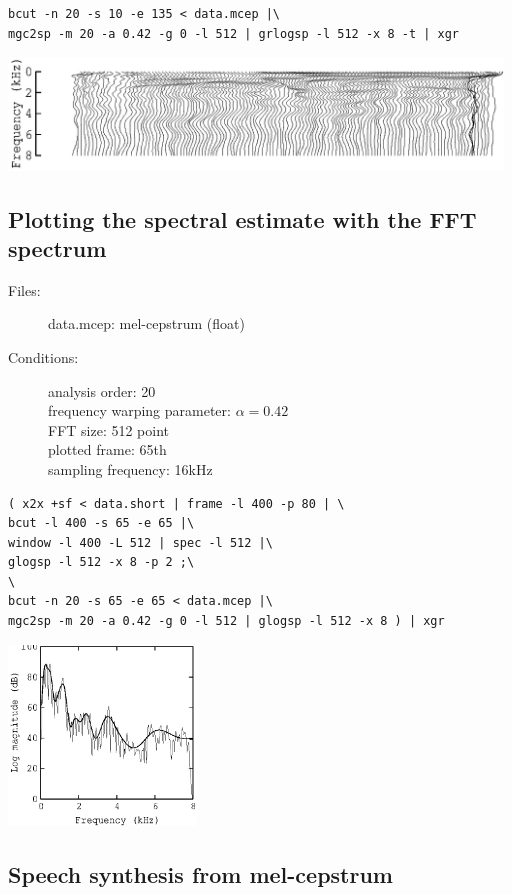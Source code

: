 \documentclass[a4paper]{article}
\begin{document}
\begin{verbatim}
bcut -n 20 -s 10 -e 135 < data.mcep |\
mgc2sp -m 20 -a 0.42 -g 0 -l 512 | grlogsp -l 512 -x 8 -t | xgr
\end{verbatim}

\includegraphics[height=3cm]{data.mcep.grlogsp-t.eps}

\subsection{Plotting the spectral estimate with the FFT spectrum}

\begin{description}
\item[Files:]
  data.mcep: mel-cepstrum (float)
\item[Conditions:]
  analysis order: 20\\
  frequency warping parameter: $\alpha = 0.42$\\
  FFT size: 512 point\\
  plotted frame: 65th\\
  sampling frequency: 16kHz
\end{description}

\begin{verbatim}
( x2x +sf < data.short | frame -l 400 -p 80 | \
bcut -l 400 -s 65 -e 65 |\
window -l 400 -L 512 | spec -l 512 |\
glogsp -l 512 -x 8 -p 2 ;\
\
bcut -n 20 -s 65 -e 65 < data.mcep |\
mgc2sp -m 20 -a 0.42 -g 0 -l 512 | glogsp -l 512 -x 8 ) | xgr
\end{verbatim}

\includegraphics[width=5cm]{data.mcep.glogsp.eps}

\subsection{Speech synthesis from mel-cepstrum}
\end{document}
